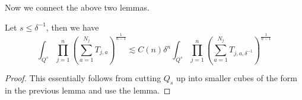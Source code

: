 Now we connect the above two lemmas.
\begin{proposition}
    Let $s\leq\delta^{-1}$, then we have
    \begin{equation*}
        \int_{Q^s}\prod_{j=1}^n\left(\sum_{a=1}^{N_j}T_{j,a}\right)^{\frac{1}{n-1}}\lesssim C(n)\delta^n\int_{Q^s}\prod_{j=1}^n\left(\sum_{a=1}^{N_j}T_{j,a,\delta^{-1}} \right)^{\frac{1}{n-1}}
    \end{equation*}
\end{proposition}
\begin{proof}
This essentially follows from cutting $Q_s$ up into smaller cubes of the form in the previous lemma and use the lemma.

\end{proof}